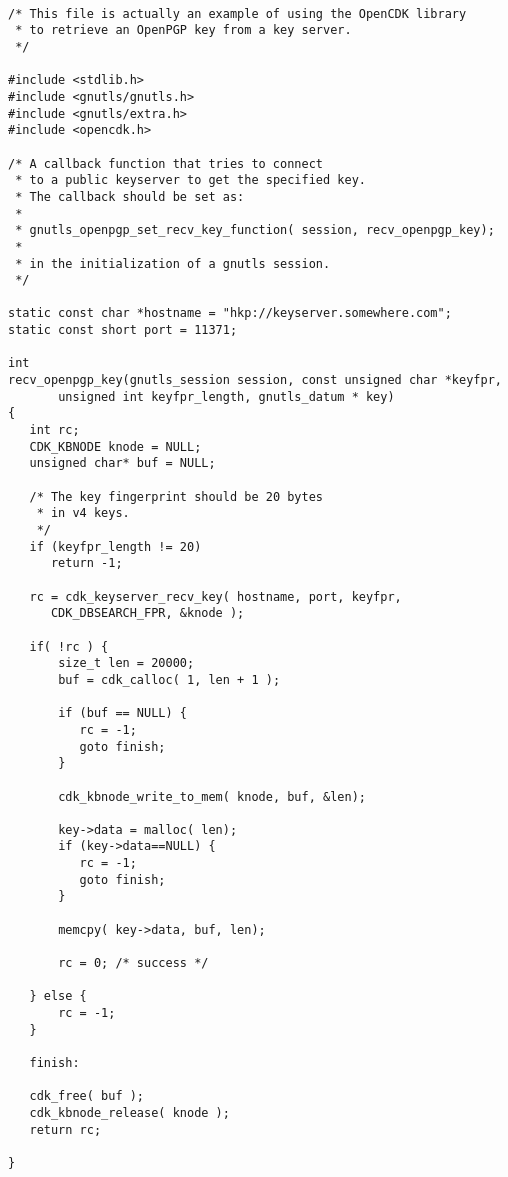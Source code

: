 \begin {verbatim}

/* This file is actually an example of using the OpenCDK library
 * to retrieve an OpenPGP key from a key server.
 */

#include <stdlib.h>
#include <gnutls/gnutls.h>
#include <gnutls/extra.h>
#include <opencdk.h>

/* A callback function that tries to connect
 * to a public keyserver to get the specified key.
 * The callback should be set as:
 *
 * gnutls_openpgp_set_recv_key_function( session, recv_openpgp_key);
 *
 * in the initialization of a gnutls session.
 */

static const char *hostname = "hkp://keyserver.somewhere.com";
static const short port = 11371;

int
recv_openpgp_key(gnutls_session session, const unsigned char *keyfpr, 
       unsigned int keyfpr_length, gnutls_datum * key)
{
   int rc;
   CDK_KBNODE knode = NULL;
   unsigned char* buf = NULL;

   /* The key fingerprint should be 20 bytes
    * in v4 keys.
    */
   if (keyfpr_length != 20)
      return -1;

   rc = cdk_keyserver_recv_key( hostname, port, keyfpr, 
      CDK_DBSEARCH_FPR, &knode );

   if( !rc ) {
       size_t len = 20000;
       buf = cdk_calloc( 1, len + 1 );

       if (buf == NULL) {
          rc = -1;
          goto finish;
       }

       cdk_kbnode_write_to_mem( knode, buf, &len);

       key->data = malloc( len);
       if (key->data==NULL) {
          rc = -1;
          goto finish;
       }

       memcpy( key->data, buf, len);

       rc = 0; /* success */

   } else {
       rc = -1;
   }

   finish:

   cdk_free( buf );
   cdk_kbnode_release( knode );
   return rc;

}


\end{verbatim}
